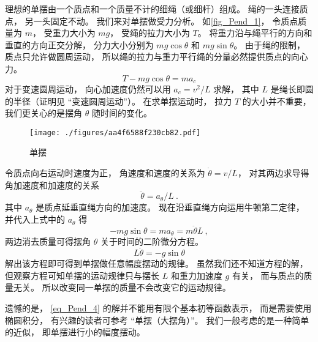 

理想的单摆由一个质点和一个质量不计的细绳（或细杆）组成。 绳的一头连接质点， 另一头固定不动。 我们来对单摆做受力分析。 如\autoref{fig_Pend_1}， 令质点质量为 $m$， 受重力大小为 $mg$， 受绳的拉力大小为 $T$。 将重力沿与绳平行的方向和垂直的方向正交分解， 分力大小分别为 $mg\cos\theta$ 和 $mg\sin\theta$。 由于绳的限制， 质点只允许做圆周运动， 所以绳的拉力与重力平行绳的分量必然提供质点的向心力。
\begin{equation}
T - mg\cos\theta = ma_c
\end{equation}
对于变速圆周运动， 向心加速度仍然可以用 $a_c = v^2/L$ 求解， 其中 $L$ 是绳长即圆的半径（证明见 “变速圆周运动”）。%
在求单摆运动时， 拉力 $T$ 的大小并不重要， 我们更关心的是摆角 $\theta$ 随时间的变化。
\begin{figure}[ht]
\centering
\texttt{[image: ./figures/aa4f6588f230cb82.pdf]}
\caption{单摆} \label{fig_Pend_1}
\end{figure}

令质点向右运动时速度为正， 角速度和速度的关系为 $\dot\theta = v/L$， 对其两边求导得角加速度和加速度的关系
\begin{equation}
\ddot\theta = a_\theta/L~.
\end{equation}
其中 $a_\theta$ 是质点延垂直绳方向的加速度。 现在沿垂直绳方向运用牛顿第二定律， 并代入上式中的 $a_\theta$ 得
\begin{equation}
-mg\sin\theta = ma_\theta = m\ddot\theta L~,
\end{equation}
两边消去质量可得摆角 $\theta$ 关于时间的二阶微分方程。
\begin{equation}\label{eq_Pend_4}
L\ddot\theta = - g\sin\theta
\end{equation}
解出该方程即可得到单摆做任意幅度摆动的规律。 虽然我们还不知道方程的解， 但观察方程可知单摆的运动规律只与摆长 $L$ 和重力加速度 $g$ 有关， 而与质点的质量无关。 所以改变同一单摆的质量不会改变它的运动规律。

遗憾的是， \autoref{eq_Pend_4} 的解并不能用有限个基本初等函数表示， 而是需要使用椭圆积分， 有兴趣的读者可参考 “单摆（大摆角）”。 我们一般考虑的是一种简单的近似， 即单摆进行小的幅度摆动。

